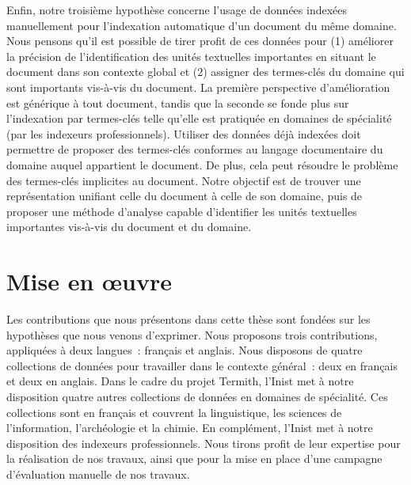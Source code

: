     Enfin, notre troisième hypothèse concerne l'usage de données indexées
    manuellement pour l'indexation automatique d'un document du même domaine. Nous pensons qu'il est possible de tirer profit de ces données
    pour (1) améliorer la précision de l'identification des unités textuelles
    importantes en situant le document dans son contexte global et (2)
    assigner des termes-clés du domaine qui sont importants vis-à-vis du document.
    La première perspective d'amélioration est générique à tout document, tandis
    que la seconde se fonde plus sur l'indexation par termes-clés telle qu'elle
    est pratiquée en
    domaines de spécialité (par les indexeurs professionnels). Utiliser des
    données déjà indexées doit permettre de proposer des termes-clés conformes
    au langage documentaire du domaine auquel appartient le
    document. De plus, cela peut résoudre le problème des termes-clés implicites
    au document.
    Notre objectif est de trouver une représentation unifiant celle du
    document à celle de son domaine, puis de proposer une méthode d'analyse
    capable d'identifier les unités textuelles importantes vis-à-vis du document
    et du domaine.


  \section{Mise en \oe{}uvre}
  \label{sec:main-introduction-realisation}
  Les contributions que nous présentons dans cette thèse sont fondées sur les
  hypothèses que nous venons d'exprimer. Nous proposons trois contributions,
  appliquées à deux langues~: français et anglais. Nous disposons de quatre
  collections de données pour travailler dans le contexte général~: deux en
  français et deux en anglais. Dans le cadre du projet Termith, l'Inist met à
  notre disposition quatre autres collections de données en domaines de
  spécialité. Ces collections sont en français et couvrent la linguistique, les
  sciences de l'information, l'archéologie et la chimie. En complément, l'Inist
  met à notre disposition des indexeurs professionnels. Nous tirons profit de
  leur expertise pour la réalisation de nos travaux, ainsi que pour la mise en
  place d'une campagne d'évaluation manuelle de nos travaux.

